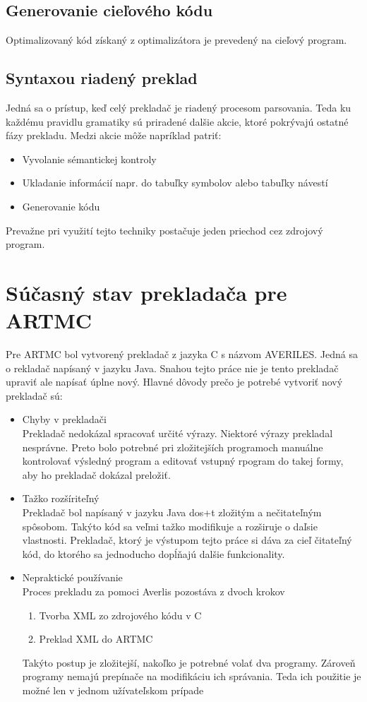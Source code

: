 \section{Generovanie cieľového kódu}
Optimalizovaný kód získaný z optimalizátora je prevedený na cieľový program.

\section{Syntaxou riadený preklad}
Jedná sa o prístup, keď celý prekladač je riadený procesom parsovania. Teda ku každému pravidlu gramatiky sú priradené dalšie akcie, ktoré pokrývajú ostatné fázy prekladu. Medzi akcie môže napríklad patriť:
\begin{itemize}
    \item Vyvolanie sémantickej kontroly
    \item Ukladanie informácií napr. do tabuľky symbolov alebo tabuľky návestí
    \item Generovanie kódu
\end{itemize}
Prevažne pri využití tejto techniky postačuje jeden priechod cez zdrojový program.


\chapter{Súčasný stav prekladača pre ARTMC}
Pre ARTMC bol vytvorený prekladač z jazyka C s názvom AVERILES. Jedná sa o
rekladač napísaný v jazyku Java. Snahou tejto práce nie je tento prekladač
upraviť ale napísať úplne nový. Hlavné dôvody prečo je potrebé vytvoriť nový
prekladač sú:
\begin{itemize}
    \item Chyby v prekladači\\
        Prekladač nedokázal spracovať určité výrazy. Niektoré výrazy prekladal nesprávne.
        Preto bolo potrebné pri zložitejších programoch manuálne kontrolovať výsledný
        program a editovať vstupný rpogram do takej formy, aby ho prekladač dokázal
        preložiť.
    \item Tažko rozšíriteľný\\
        Prekladač bol napísaný v jazyku Java dos+t zložitým a nečitateľným spôsobom. Takýto
        kód sa veľmi tažko modifikuje a rozširuje o daľsie vlastnosti. Prekladač,
        ktorý je výstupom tejto práce si dáva za cieľ čitateľný kód, do ktorého
        sa jednoducho dopĺňajú dalšie funkcionality.
    \item Nepraktické používanie\\
        Proces prekladu za pomoci Averlis pozostáva z dvoch krokov
        \begin{enumerate}
            \item Tvorba XML zo zdrojového kódu v C
            \item Preklad XML do ARTMC
        \end{enumerate}
        Takýto postup je zložitejší, nakoľko je potrebné volať dva programy.
        Zároveň programy nemajú prepínače na modifikáciu ich správania. Teda
        ich použitie je možné len v jednom užívateľskom prípade
\end{itemize}


